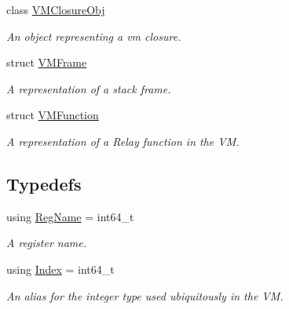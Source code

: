 \begin{DoxyCompactItemize}
class \hyperlink{classtvm_1_1runtime_1_1vm_1_1VMClosureObj}{V\+M\+Closure\+Obj}
\begin{DoxyCompactList}\small\item\em An object representing a vm closure. \end{DoxyCompactList}\item 
struct \hyperlink{structtvm_1_1runtime_1_1vm_1_1VMFrame}{V\+M\+Frame}
\begin{DoxyCompactList}\small\item\em A representation of a stack frame. \end{DoxyCompactList}\item 
struct \hyperlink{structtvm_1_1runtime_1_1vm_1_1VMFunction}{V\+M\+Function}
\begin{DoxyCompactList}\small\item\em A representation of a Relay function in the VM. \end{DoxyCompactList}\end{DoxyCompactItemize}
\subsection*{Typedefs}
\begin{DoxyCompactItemize}
\item 
using \hyperlink{namespacetvm_1_1runtime_1_1vm_a3bbbf700719e9dc3dda2bc25210c18ae}{Reg\+Name} = int64\+\_\+t
\begin{DoxyCompactList}\small\item\em A register name. \end{DoxyCompactList}\item 
using \hyperlink{namespacetvm_1_1runtime_1_1vm_a3597867d2db714bf760876a23d6b7d3d}{Index} = int64\+\_\+t
\begin{DoxyCompactList}\small\item\em An alias for the integer type used ubiquitously in the VM. \end{DoxyCompactList}\end{DoxyCompactItemize}
